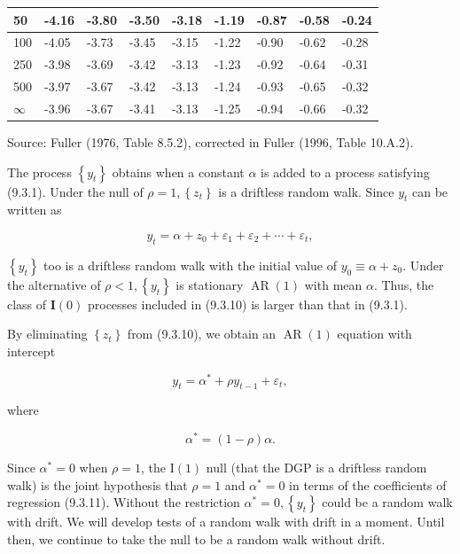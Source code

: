 \documentclass[10pt]{article}
\begin{document}
\begin{table}[h]
\begin{center}
\begin{tabular}{|l|l|l|l|l|l|l|l|l|}
\hline
50 & -4.16 & -3.80 & -3.50 & -3.18 & -1.19 & -0.87 & -0.58 & -0.24 \\
\hline
100 & -4.05 & -3.73 & -3.45 & -3.15 & -1.22 & -0.90 & -0.62 & -0.28 \\
\hline
250 & -3.98 & -3.69 & -3.42 & -3.13 & -1.23 & -0.92 & -0.64 & -0.31 \\
\hline
500 & -3.97 & -3.67 & -3.42 & -3.13 & -1.24 & -0.93 & -0.65 & -0.32 \\
\hline
$\infty$ & -3.96 & -3.67 & -3.41 & -3.13 & -1.25 & -0.94 & -0.66 & -0.32 \\
\hline
\end{tabular}
\end{center}
\end{table}

Source: Fuller (1976, Table 8.5.2), corrected in Fuller (1996, Table 10.A.2).

The process $\left\{y_{t}\right\}$ obtains when a constant $\alpha$ is added to a process satisfying (9.3.1). Under the null of $\rho=1,\left\{z_{t}\right\}$ is a driftless random walk. Since $y_{t}$ can be written as

$$
y_{t}=\alpha+z_{0}+\varepsilon_{1}+\varepsilon_{2}+\cdots+\varepsilon_{t},
$$

$\left\{y_{t}\right\}$ too is a driftless random walk with the initial value of $y_{0} \equiv \alpha+z_{0}$. Under the alternative of $\rho<1,\left\{y_{t}\right\}$ is stationary $\operatorname{AR}(1)$ with mean $\alpha$. Thus, the class of $\mathbf{I}(0)$ processes included in (9.3.10) is larger than that in (9.3.1).

By eliminating $\left\{z_{t}\right\}$ from (9.3.10), we obtain an $\operatorname{AR}(1)$ equation with intercept


\begin{equation*}
y_{t}=\alpha^{*}+\rho y_{t-1}+\varepsilon_{t}, \tag{9.3.11}
\end{equation*}


where


\begin{equation*}
\alpha^{*}=(1-\rho) \alpha . \tag{9.3.12}
\end{equation*}


Since $\alpha^{*}=0$ when $\rho=1$, the $\mathrm{I}(1)$ null (that the DGP is a driftless random walk) is the joint hypothesis that $\rho=1$ and $\alpha^{*}=0$ in terms of the coefficients of regression (9.3.11). Without the restriction $\alpha^{*}=0,\left\{y_{t}\right\}$ could be a random walk with drift. We will develop tests of a random walk with drift in a moment. Until then, we continue to take the null to be a random walk without drift.
\end{document}

